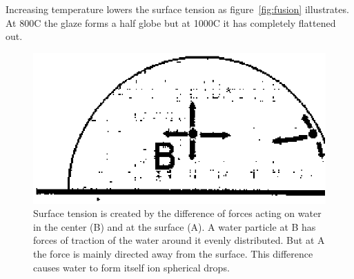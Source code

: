 Increasing temperature lowers the surface tension as 
figure~\ref{fig:fusion} illustrates. At 800\degree C the glaze forms a half 
globe but at 1000\degree C it has completely flattened out.
\begin{figure}[htbp!]
  \centering
  \includegraphics[width=0.5\linewidth]{img/surfacetension.eps}
  \caption{Surface tension is created by the difference of forces acting on 
  water 
    in the center (B) and at the surface (A). A water particle at B has forces 
    of traction of the water around it evenly distributed. But at A the force 
    is 
    mainly directed away from the surface. This difference causes water to form 
    itself ion spherical drops.}
  \label{fig:surfacetensionimage}
\end{figure}
